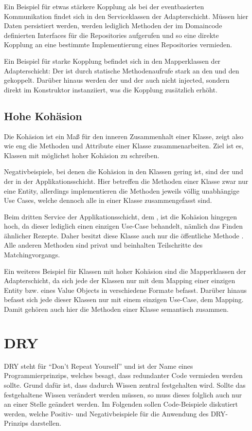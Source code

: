 Ein Beispiel für etwas stärkere Kopplung als bei der eventbasierten Kommunikation findet sich in den Serviceklassen der Adapterschicht. Müssen hier Daten persistiert werden, werden lediglich Methoden der im Domaincode definierten Interfaces für die Repositories aufgerufen und so eine direkte Kopplung an eine bestimmte Implementierung eines Repositories vermieden.

Ein Beispiel für starke Kopplung befindet sich in den Mapperklassen der Adapterschicht: Der  ist durch statische Methodenaufrufe stark an den  und den  gekoppelt. Darüber hinaus werden der  und der  auch nicht injected, sondern direkt im Konstruktor instanziiert, was die Kopplung zusätzlich erhöht.

\subsection{Hohe Kohäsion}
Die Kohäsion ist ein Maß für den inneren Zusammenhalt einer Klasse, zeigt also wie eng die Methoden und Attribute einer Klasse zusammenarbeiten. Ziel ist es, Klassen mit möglichst hoher Kohäsion zu schreiben.

Negativbeispiele, bei denen die Kohäsion in den Klassen gering ist, sind der  und der  in der Applikationsschicht. Hier betreffen die Methoden einer Klasse zwar nur eine Entity, allerdings implementieren die Methoden jeweils völlig unabhängige Use Cases, welche dennoch alle in einer Klasse zusammengefasst sind.

Beim dritten Service der Applikationsschicht, dem , ist die Kohäsion hingegen hoch, da dieser lediglich einen einzigen Use-Case behandelt, nämlich das Finden ähnlicher Rezepte. Daher besitzt diese Klasse auch nur die öffentliche Methode . Alle anderen Methoden sind privat und beinhalten Teilschritte des Matchingvorgangs.

Ein weiteres Beispiel für Klassen mit hoher Kohäsion sind die Mapperklassen der Adapterschicht, da sich jede der Klassen nur mit dem Mapping einer einzigen Entity bzw. eines Value Objects in verschiedene Formate befasst. Darüber hinaus befasst sich jede dieser Klassen nur mit einem einzigen Use-Case, dem Mapping. Damit gehören auch hier die Methoden einer Klasse semantisch zusammen.

\section{DRY}
DRY steht für \enquote{Don't Repeat Yourself} und ist der Name eines Programmierprinzips, welches besagt, dass redundanter Code vermieden werden sollte. Grund dafür ist, dass dadurch Wissen zentral festgehalten wird. Sollte das festgehaltene Wissen verändert werden müssen, so muss dieses folglich auch nur an einer Stelle geändert werden. Im Folgenden sollen Code-Beispiele diskutiert werden, welche Positiv- und Negativbeispiele für die Anwendung des DRY-Prinzips darstellen.

